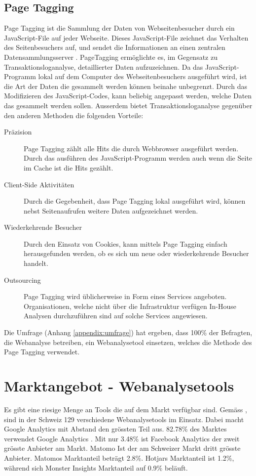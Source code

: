 \subsection{Page Tagging} 
Page Tagging ist die Sammlung der Daten von Webseitenbesucher durch ein JavaScript-File auf jeder Webseite. Dieses JavaScript-File zeichnet das Verhalten des Seitenbesuchers auf, und sendet die Informationen an einen zentralen Datensammlungsserver \parencite[S. 173]{nakatani2011toolselectionmethod}. PageTagging ermöglichte es, im Gegensatz zu Transaktionsloganalyse, detaillierter Daten aufzuzeichnen. Da das JavaScript-Programm lokal auf dem Computer des Webseitenbesuchers ausgeführt wird, ist die Art der Daten die gesammelt werden können beinahe unbegrenzt. Durch das Modifizieren des JavaScript-Codes, kann beliebig angepasst werden, welche Daten das gesammelt werden sollen. Ausserdem bietet Transaktionsloganalyse gegenüber den anderen Methoden die folgenden Vorteile\parencite[S. 174]{nakatani2011toolselectionmethod}:

\begin{description}
  \item[Präzision] Page Tagging zählt alle Hits die durch Webbrowser ausgeführt werden. Durch das ausführen des JavaScript-Programm werden auch wenn die Seite im Cache ist die Hits gezählt.
  \item[Client-Side Aktivitäten] Durch die Gegebenheit, dass Page Tagging lokal ausgeführt wird, können nebst Seitenaufrufen weitere Daten aufgezeichnet werden.
  \item[Wiederkehrende Besucher] Durch den Einsatz von Cookies, kann mittels Page Tagging einfach herausgefunden werden, ob es sich um neue oder wiederkehrende Besucher handelt.
  \item[Outsourcing] Page Tagging wird üblicherweise in Form eines Services angeboten. Organisationen, welche nicht über die Infrastruktur verfügen In-House Analysen durchzuführen sind auf solche Services angewiesen.
\end{description}

Die Umfrage (Anhang \ref{appendix:umfrage}) hat ergeben, dass 100\% der Befragten, die Webanalyse betreiben, ein Webanalysetool einsetzen, welches die Methode des Page Tagging verwendet.

\newpage
\section{Marktangebot - Webanalysetools}
Es gibt eine riesige Menge an Tools die auf dem Markt verfügbar sind. Gemäss \parencite{datanyzeSwitzerlandWebanalytics}, sind in der Schweiz 129 verschiedene Webanalysetools im Einsatz. Dabei macht Google Analytics mit Abstand den grössten Teil aus. 82.78\% des Marktes verwendet Google Analytics . Mit nur 3.48\% ist Facebook Analytics der zweit grösste Anbieter am Markt. Matomo Ist der am Schweizer Markt dritt grösste Anbieter. Matomos Marktanteil beträgt 2.8\%. Hotjars Marktanteil ist 1.2\%, während sich Monster Insights Marktanteil auf 0.9\% beläuft. 

